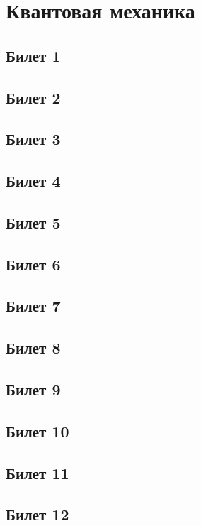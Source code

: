 


\tableofcontents
\section{Квантовая механика} %
\newpage
\subsection{Билет 1} 

\subsection{Билет 2}

\subsection{Билет 3}

\subsection{Билет 4}

\subsection{Билет 5}

\subsection{Билет 6}

\subsection{Билет 7}

\subsection{Билет 8}

\subsection{Билет 9}

\subsection{Билет 10}

\subsection{Билет 11}

\subsection{Билет 12}

